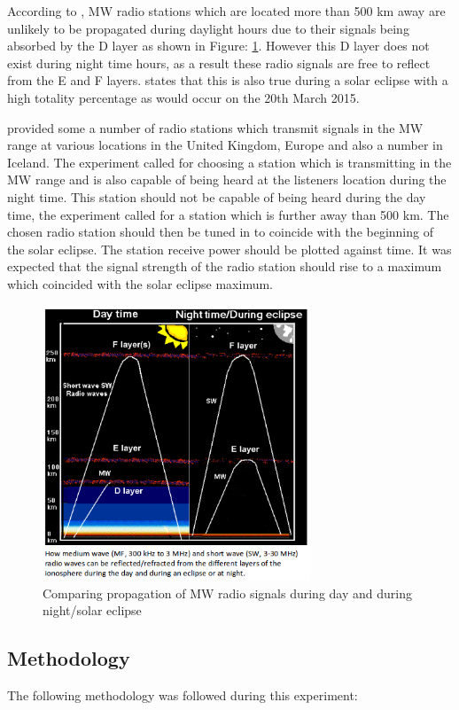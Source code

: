 \documentclass[runningheads,a4paper]{llncs}
\begin{document}
According to \cite{nichols-15-a}, \gls{MW} radio stations which are located more than 500 km away are unlikely to be propagated during daylight hours due to their signals being absorbed by the D layer as shown in Figure: \ref{fig:atmosphere_ionisation_effects_mw}. However this D layer does not exist during night time hours, as a result these radio signals are free to reflect from the E and F layers. \cite{RSGB-15-b} states that this is also true during a solar eclipse with a high totality percentage as would occur on the 20th March 2015.

\cite{RSGB-15-b} provided some a number of radio stations which transmit signals in the \gls{MW} range at various locations in the United Kingdom, Europe and also a number in Iceland. The experiment called for choosing a station which is transmitting in the \gls{MW} range and is also capable of being heard at the listeners location during the night time. This station should not be capable of being heard during the day time, the experiment called for a station which is further away than 500 km. The chosen radio station should then be tuned in to coincide with the beginning of the solar eclipse. The station receive power should be plotted against time. It was expected that the signal strength of the radio station should rise to a maximum which coincided with the solar eclipse maximum.


%
\begin{figure}[here]
	\centering
	\includegraphics[width=8cm]{images/53}
	\caption{Comparing propagation of \gls{MW} radio signals during day and during night/solar eclipse \citep{RSGB-15-b}}
	\label{fig:atmosphere_ionisation_effects_mw}
\end{figure}
%

\subsection*{Methodology}
The following methodology was followed during this experiment:
\end{document}
